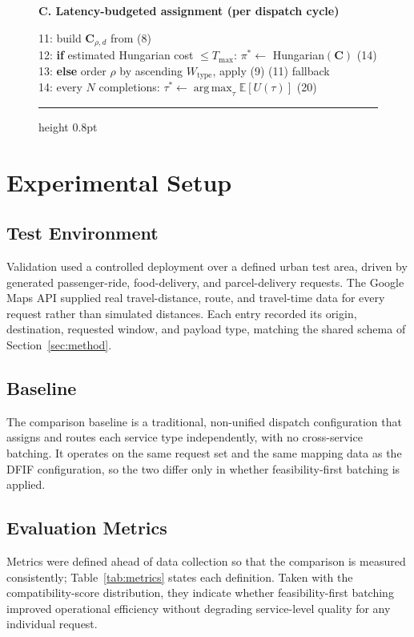 \documentclass[conference]{IEEEtran}
\DeclareMathOperator*{\argmax}{arg\,max}
\begin{document}
\begin{figure}[t]
\vspace{3pt}\noindent\textbf{C. Latency-budgeted assignment (per dispatch cycle)}

\vspace{1pt}\noindent
\hspace*{0.4em}11: build $\mathbf{C}_{\rho,d}$ from (8)\\
\hspace*{0.4em}12: \textbf{if} estimated Hungarian cost $\le T_{\max}$:
 $\pi^{*}\leftarrow$ Hungarian$(\mathbf{C})$ \hfill (14)\\
\hspace*{0.4em}13: \textbf{else} order $\rho$ by ascending $W_{\text{type}}$,
 apply (9) \hfill (11) fallback\\
\hspace*{0.4em}14: every $N$ completions:
 $\tau^{*}\leftarrow\argmax_\tau\mathbb{E}[U(\tau)]$ \hfill (20)

\vspace{2pt}\hrule height 0.8pt
\end{figure}

\section{Experimental Setup}

\subsection{Test Environment}
Validation used a controlled deployment over a defined urban test area,
driven by generated passenger-ride, food-delivery, and parcel-delivery
requests. The Google Maps API supplied real travel-distance,
route, and travel-time data for every request rather than simulated distances.
Each entry recorded its origin, destination, requested window, and payload
type, matching the shared schema of Section~\ref{sec:method}.

\subsection{Baseline}
The comparison baseline is a traditional, non-unified dispatch configuration
that assigns and routes each service type independently, with no cross-service
batching. It operates on the same request set and the same mapping data as the
DFIF configuration, so the two differ only in whether feasibility-first
batching is applied.

\subsection{Evaluation Metrics}
Metrics were defined ahead of data collection so that the comparison is
measured consistently; Table~\ref{tab:metrics} states each definition. Taken
with the compatibility-score distribution, they indicate whether
feasibility-first batching improved operational efficiency without degrading
service-level quality for any individual request.
\end{document}
